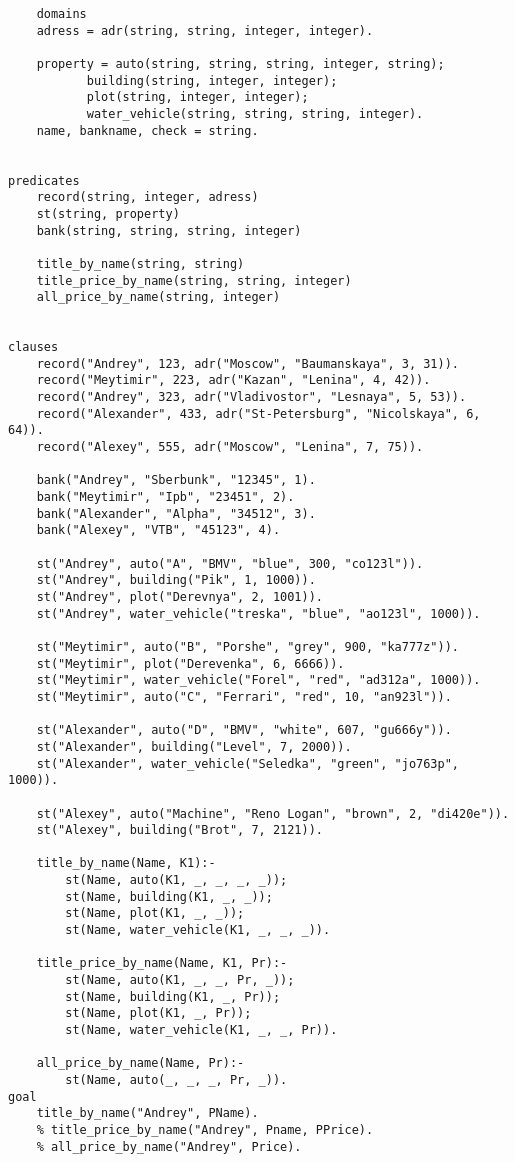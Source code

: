 \begin{lstlisting}
	domains
	adress = adr(string, string, integer, integer).
	
	property = auto(string, string, string, integer, string);
		   building(string, integer, integer);
		   plot(string, integer, integer);
		   water_vehicle(string, string, string, integer).
	name, bankname, check = string.

	
predicates
	record(string, integer, adress)
	st(string, property)
	bank(string, string, string, integer)

	title_by_name(string, string)
	title_price_by_name(string, string, integer)
	all_price_by_name(string, integer)


clauses
	record("Andrey", 123, adr("Moscow", "Baumanskaya", 3, 31)).
	record("Meytimir", 223, adr("Kazan", "Lenina", 4, 42)).
	record("Andrey", 323, adr("Vladivostor", "Lesnaya", 5, 53)).
	record("Alexander", 433, adr("St-Petersburg", "Nicolskaya", 6, 64)).
	record("Alexey", 555, adr("Moscow", "Lenina", 7, 75)).

	bank("Andrey", "Sberbunk", "12345", 1).
	bank("Meytimir", "Ipb", "23451", 2).
	bank("Alexander", "Alpha", "34512", 3).
	bank("Alexey", "VTB", "45123", 4).

	st("Andrey", auto("A", "BMV", "blue", 300, "co123l")).
	st("Andrey", building("Pik", 1, 1000)).
	st("Andrey", plot("Derevnya", 2, 1001)).
	st("Andrey", water_vehicle("treska", "blue", "ao123l", 1000)).	

	st("Meytimir", auto("B", "Porshe", "grey", 900, "ka777z")).
	st("Meytimir", plot("Derevenka", 6, 6666)).
	st("Meytimir", water_vehicle("Forel", "red", "ad312a", 1000)).
	st("Meytimir", auto("C", "Ferrari", "red", 10, "an923l")).
	
	st("Alexander", auto("D", "BMV", "white", 607, "gu666y")).
	st("Alexander", building("Level", 7, 2000)).
	st("Alexander", water_vehicle("Seledka", "green", "jo763p", 1000)).

	st("Alexey", auto("Machine", "Reno Logan", "brown", 2, "di420e")).
	st("Alexey", building("Brot", 7, 2121)).
	
	title_by_name(Name, K1):-
		st(Name, auto(K1, _, _, _, _));
		st(Name, building(K1, _, _));
		st(Name, plot(K1, _, _));
		st(Name, water_vehicle(K1, _, _, _)).
	
	title_price_by_name(Name, K1, Pr):-
		st(Name, auto(K1, _, _, Pr, _));
		st(Name, building(K1, _, Pr));
		st(Name, plot(K1, _, Pr));
		st(Name, water_vehicle(K1, _, _, Pr)).
	
	all_price_by_name(Name, Pr):-
		st(Name, auto(_, _, _, Pr, _)).
goal
	title_by_name("Andrey", PName).
	% title_price_by_name("Andrey", Pname, PPrice).
	% all_price_by_name("Andrey", Price).
\end{lstlisting}
